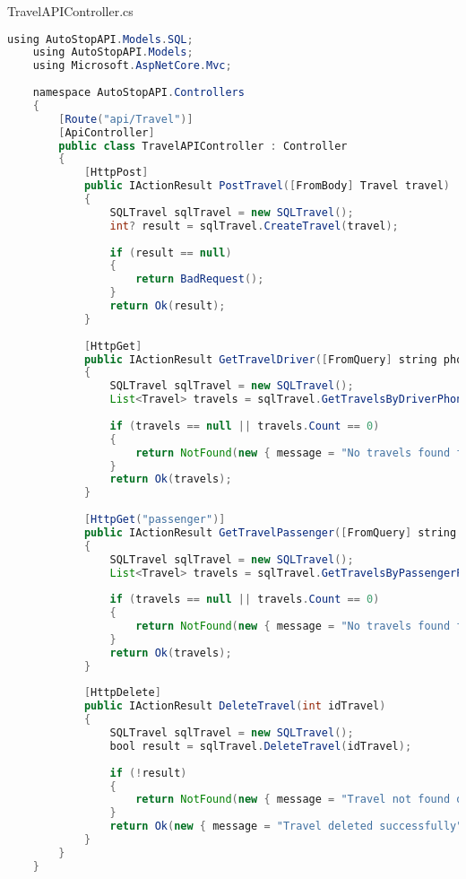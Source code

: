 TravelAPIController.cs
\begin{lstlisting}[language=Java]
	using AutoStopAPI.Models.SQL;
	using AutoStopAPI.Models;
	using Microsoft.AspNetCore.Mvc;
	
	namespace AutoStopAPI.Controllers
	{
		[Route("api/Travel")]
		[ApiController]
		public class TravelAPIController : Controller
		{
			[HttpPost]
			public IActionResult PostTravel([FromBody] Travel travel)
			{
				SQLTravel sqlTravel = new SQLTravel();
				int? result = sqlTravel.CreateTravel(travel);
				
				if (result == null)
				{
					return BadRequest();
				}
				return Ok(result);
			}
			
			[HttpGet]
			public IActionResult GetTravelDriver([FromQuery] string phoneDriver) 
			{
				SQLTravel sqlTravel = new SQLTravel();
				List<Travel> travels = sqlTravel.GetTravelsByDriverPhone(phoneDriver);
				
				if (travels == null || travels.Count == 0)
				{
					return NotFound(new { message = "No travels found for the given driver phone number" });
				}
				return Ok(travels);
			}
			
			[HttpGet("passenger")]
			public IActionResult GetTravelPassenger([FromQuery] string phonePassenger)
			{
				SQLTravel sqlTravel = new SQLTravel();
				List<Travel> travels = sqlTravel.GetTravelsByPassengerPhone(phonePassenger);
				
				if (travels == null || travels.Count == 0)
				{
					return NotFound(new { message = "No travels found for the given passenger phone number" });
				}
				return Ok(travels);
			}
			
			[HttpDelete]
			public IActionResult DeleteTravel(int idTravel)
			{
				SQLTravel sqlTravel = new SQLTravel();
				bool result = sqlTravel.DeleteTravel(idTravel);
				
				if (!result)
				{
					return NotFound(new { message = "Travel not found or could not be deleted" });
				}
				return Ok(new { message = "Travel deleted successfully" });
			}
		}
	}
\end{lstlisting}

